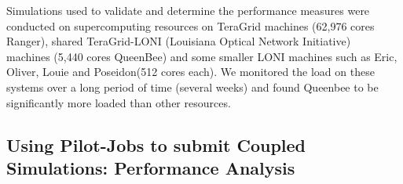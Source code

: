 \documentclass[conference,final]{IEEEtran}
\newcommand{\jhanote}[1]{ {\textcolor{red} { ***Jha: #1 }}}
\newcommand{\jhanote}[1]{}
\begin{document}
Simulations used to validate and determine the performance measures
were conducted on supercomputing resources on TeraGrid machines
(62,976 cores Ranger), shared TeraGrid-LONI (Louisiana Optical Network
Initiative)~\cite{LONI_web} machines (5,440 cores QueenBee) and some
smaller LONI machines such as Eric, Oliver, Louie and Poseidon(512
cores each).  We monitored the load on these systems over a long
period of time (several weeks) and found Queenbee to be significantly
more loaded than other resources.



\subsection{Using Pilot-Jobs to submit Coupled Simulations:
  Performance Analysis}
  

\end{document}
